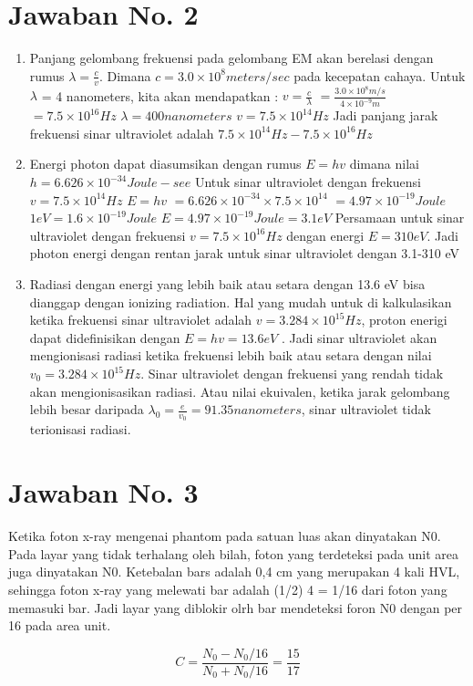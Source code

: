 \section{Jawaban No. 2}
\begin{enumerate}
\item Panjang gelombang frekuensi pada gelombang EM akan berelasi dengan rumus $\lambda =  \frac{c}{v}$. Dimana $\mathit{c} = 3.0 \times 10^{8} meters/sec$ pada kecepatan cahaya. Untuk $\lambda$ = 4 nanometers, kita akan mendapatkan :
\subitem  $ v =\frac{c}{\lambda}$
\subitem  $ = \frac{ 3.0 \times 10^{8}m/s}{4 \times 10^{-9}m}$
\subitem $= 7.5 \times 10^{16}Hz$
\subitem$\lambda = 400{nanometers}$ 
\subitem$v = 7.5 \times 10^{14}Hz$
\subitem Jadi panjang jarak frekuensi sinar ultraviolet adalah
$7.5 \times 10^{14}Hz - 7.5 \times 10^{16}Hz$

\item Energi photon dapat diasumsikan dengan rumus $E = hv$ dimana nilai $h = 6.626 \times 10^{-34} Joule-see$ Untuk sinar ultraviolet dengan frekuensi $v = 7.5 \times 10^{14}Hz$
\subitem$E = hv$
\subitem $=  6.626 \times 10^{-34} \times 7.5 \times 10^{14}$
\subitem $=  4.97 \times 10^{-19} Joule$
\subitem $1 eV = 1.6 \times 10^{-19} Joule$
\subitem $E = 4.97 \times 10^{-19} Joule = 3.1 eV$
\subitem Persamaan untuk sinar ultraviolet dengan frekuensi $v = 7.5 \times 10^{16}Hz$ dengan energi $E = 310 eV$. Jadi photon energi dengan rentan jarak untuk sinar ultraviolet dengan 3.1-310 eV 

\item Radiasi dengan energi yang lebih baik atau setara dengan 13.6 eV bisa dianggap dengan ionizing radiation. Hal yang mudah untuk di kalkulasikan ketika frekuensi sinar ultraviolet adalah $v = 3.284 \times 10^{15} Hz$, proton enerigi dapat didefinisikan dengan $E = hv = 13.6 eV$ . Jadi sinar ultraviolet akan mengionisasi radiasi ketika frekuensi lebih baik atau setara dengan nilai $v_{0} = 3.284 \times 10^{15}Hz$. Sinar ultraviolet dengan frekuensi yang rendah tidak akan mengionisasikan radiasi. Atau nilai ekuivalen, ketika jarak gelombang lebih besar daripada $\lambda_{0} = \frac{e}{v_{0}} = 91.35 nanometers$, sinar ultraviolet tidak terionisasi radiasi. 
\end{enumerate}

\section{Jawaban No. 3}
Ketika foton x-ray mengenai phantom pada satuan luas akan dinyatakan N0. Pada layar yang tidak terhalang oleh bilah, foton yang terdeteksi pada unit area juga dinyatakan N0. Ketebalan bars adalah 0,4 cm yang merupakan 4 kali HVL, sehingga foton x-ray yang melewati bar adalah (1/2) 4 = 1/16 dari foton yang memasuki bar. Jadi layar yang diblokir olrh bar mendeteksi foron N0 dengan per 16 pada area unit. 

$$C=\frac {N_0 - N_0/16}{N_0 + N_0/16} = \frac{15}{17}$$